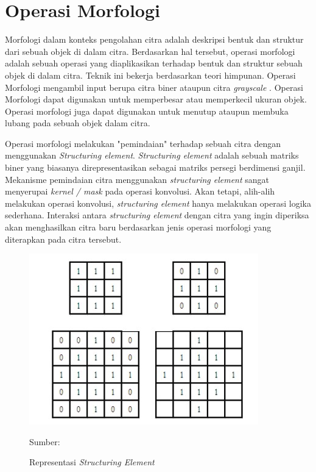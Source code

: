         
\section{Operasi Morfologi}
    Morfologi dalam konteks pengolahan citra adalah deskripsi bentuk dan struktur dari sebuah objek di dalam citra. Berdasarkan hal tersebut, operasi morfologi adalah sebuah operasi yang diaplikasikan terhadap bentuk dan struktur sebuah objek di dalam citra. Teknik ini bekerja berdasarkan teori himpunan. Operasi Morfologi mengambil input berupa citra biner ataupun citra \textit{grayscale} \citep{Srisha2013}. Operasi Morfologi dapat digunakan untuk memperbesar atau memperkecil ukuran objek. Operasi morfologi juga dapat digunakan untuk menutup ataupun membuka lubang pada sebuah objek dalam citra.
    
    Operasi morfologi melakukan "pemindaian" terhadap sebuah citra dengan menggunakan \textit{Structuring element}. \textit{Structuring element} adalah sebuah matriks biner yang biasanya direpresentasikan sebagai matriks persegi berdimensi ganjil. Mekanisme pemindaian citra menggunakan \textit{structuring element} sangat menyerupai \textit{kernel / mask} pada operasi konvolusi. Akan tetapi, alih-alih melakukan operasi konvolusi, \textit{structuring element} hanya melakukan operasi logika sederhana. Interaksi antara \textit{structuring element} dengan citra yang ingin diperiksa akan menghasilkan citra baru berdasarkan jenis operasi morfologi yang diterapkan pada citra tersebut.
    \begin{figure}[H]
    \centering
      \singlespacing
      \includegraphics{image/StructuringElement.jpg}
      \caption{Representasi \textit{Structuring Element}}
      \small{Sumber: \citet{Srisha2013}}
      \label{fig:SS}
    \end{figure}
    
